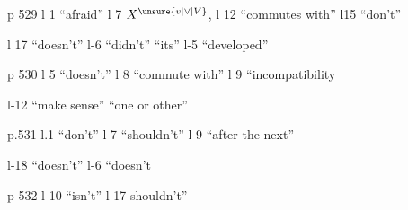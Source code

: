 p 529 l 1 ``afraid'' \quad l 7 $X^{\unsure{v|\vee|V}}$, \quad l 12 ``commutes with'' \quad l15 ``don't''

l 17 ``doesn't'' \quad l-6 ``didn't'' ``its'' \quad l-5 ``developed''

p 530 l 5 ``doesn't'' \quad l 8  ``commute with'' \quad l 9 ``incompatibility

l-12 ``make sense'' ``one or other''

p.531 l.1 ``don't'' \quad l 7 ``shouldn't'' \quad l 9 ``after the next''

l-18 ``doesn't'' \quad l-6 ``doesn't

p 532 l 10 ``isn't'' \quad l-17 shouldn't'' \quad {}

